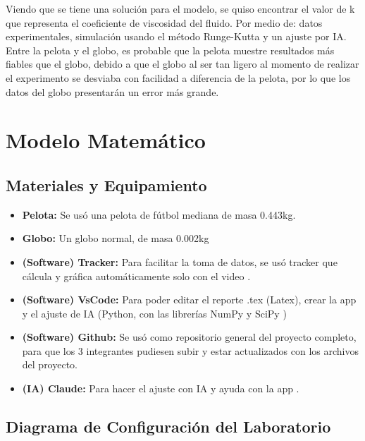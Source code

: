 \documentclass[12pt, journal]{IEEEtran}
\begin{document}
		Viendo que se tiene una solución para el modelo, se quiso encontrar el valor de k que representa el coeficiente de viscosidad del fluido. Por medio de:
		datos experimentales, simulación usando el método Runge-Kutta y un ajuste por IA.
		\\ Entre la pelota y el globo, es probable que la pelota muestre resultados más fiables que el globo, debido a que el globo al ser tan ligero
		al momento de realizar el experimento se desviaba con facilidad a diferencia de la pelota, por lo que los datos del globo presentarán un error más grande.
	\section{Modelo Matemático}



	\subsection{Materiales y Equipamiento}
	\begin{itemize}
		\item \textbf{Pelota:} Se usó una pelota de fútbol mediana de masa 0.443kg.
		\item \textbf{Globo:} Un globo normal, de masa 0.002kg
		\item \textbf{(Software) Tracker:} Para facilitar la toma de datos, se usó tracker que cálcula y gráfica automáticamente solo con el video \cite{Tracker}.
		\item \textbf{(Software) VsCode:} Para poder editar el reporte .tex (Latex), crear la app y el ajuste de IA (Python, con las librerías NumPy \cite{NumPy} y SciPy \cite{SciPy})
		\item \textbf{(Software) Github:} Se usó como repositorio general del proyecto completo, para que los 3 integrantes pudiesen subir y estar actualizados con los archivos del proyecto.
		\item \textbf{(IA) Claude:} Para hacer el ajuste con IA y ayuda con la app \cite{Claude}.
	\end{itemize}
	\subsection{Diagrama de Configuración del Laboratorio}
\end{document}
